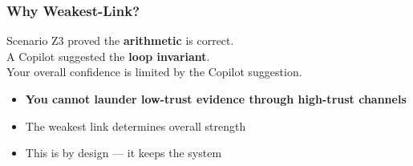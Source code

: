 \begin{frame}
\frametitle{Why Weakest-Link?}
\begin{exampleblock}{Scenario}
Z3 proved the \textbf{arithmetic} is correct.\\
A Copilot suggested the \textbf{loop invariant}.\\[4pt]
Your overall confidence is limited by the Copilot suggestion.
\end{exampleblock}
\vspace{0.4cm}
\begin{center}
\end{center}
\vfill
\begin{itemize}
  \item \textcolor{jugeoRed}{\textbf{You cannot launder low-trust evidence through high-trust channels}}
  \item The weakest link determines overall strength
  \item This is by design --- it keeps the system 
\end{itemize}
\end{frame}

